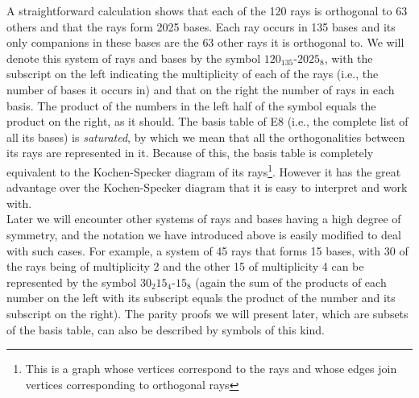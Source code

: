 A straightforward calculation shows that each of the 120 rays is orthogonal to 63 others and that the rays form 2025 bases. Each ray occurs in 135 bases and its only companions in these bases are the 63 other rays it is orthogonal to. We will denote this system of rays and bases by the symbol $120_{135}$-$2025_{8}$, with the subscript on the left indicating the multiplicity of each of the rays (i.e., the number of bases it occurs in) and that on the right the number of rays in each basis. The product of the numbers in the left half of the symbol equals the product on the right, as it should. The basis table of E8 (i.e., the complete list of all its bases) is \textit{saturated}, by which we mean that all the orthogonalities between its rays are represented in it. Because of this, the basis table is completely equivalent to the Kochen-Specker diagram of its rays\footnote{This is a graph whose vertices correspond to the rays and whose edges join vertices corresponding to orthogonal rays}. However it has the great advantage over the Kochen-Specker diagram that it is easy to interpret and work with.\\

Later we will encounter other systems of rays and bases having a high degree of symmetry, and the notation we have introduced above is easily modified to deal with such cases. For example, a system of 45 rays that forms 15 bases, with 30 of the rays being of multiplicity 2 and the other 15 of multiplicity 4 can be represented by the symbol $30_{2}15_{4}$-$15_{8}$ (again the sum of the products of each number on the left with its subscript equals the product of the number and its subscript on the right). The parity proofs we will present later, which are subsets of the basis table, can also be described by symbols of this kind.\\


